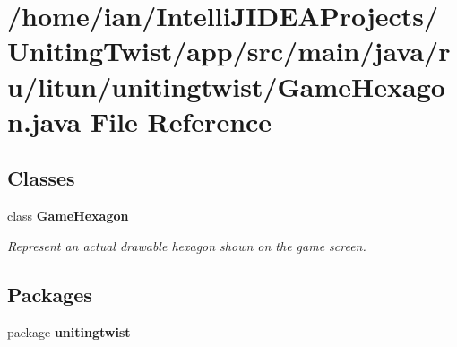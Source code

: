 \section{/home/ian/\+Intelli\+J\+I\+D\+E\+A\+Projects/\+Uniting\+Twist/app/src/main/java/ru/litun/unitingtwist/\+Game\+Hexagon.java File Reference}
\label{_game_hexagon_8java}
\subsection*{Classes}
\begin{DoxyCompactItemize}
\item 
class \textbf{ Game\+Hexagon}
\begin{DoxyCompactList}\small\item\em Represent an actual drawable hexagon shown on the game screen. \end{DoxyCompactList}\end{DoxyCompactItemize}
\subsection*{Packages}
\begin{DoxyCompactItemize}
\item 
package \textbf{ unitingtwist}
\end{DoxyCompactItemize}
